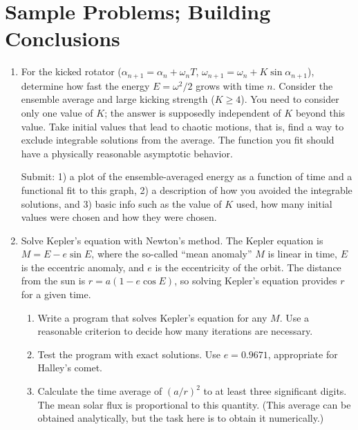 \documentclass{article}
\begin{document}
\section{Sample Problems; Building Conclusions}
\begin{enumerate}
\item \label{prbl:kicked}

For the kicked rotator ($\alpha_{n+1}=\alpha_n+\omega_n T$, $\omega_{n+1}=\omega_n + K\sin\alpha_{n+1}$), determine how fast the energy $E=\omega^2/2$ grows with time $n$.  
Consider the ensemble average and large kicking strength ($K \geq 4$). You need to consider only one value of $K$; the answer is supposedly independent of $K$ beyond this value.
Take initial values that lead to chaotic motions, that is, find a way to exclude integrable solutions from the average.
The function you fit should have a physically reasonable asymptotic behavior.


Submit:  1) a plot of the ensemble-averaged energy as a function of time and a functional fit to this graph, 
2) a description of how you avoided the integrable solutions, and 
3) basic info such as the value of $K$ used, how many initial values were chosen and how they were chosen. \\




\item\label{prbl:kepler}

Solve Kepler's equation with Newton's method.
The Kepler equation is $M=E-e\sin E$, where the so-called ``mean anomaly'' $M$ is linear in time, $E$ is the eccentric anomaly, and $e$ is the eccentricity of the orbit. The distance from the sun is $r = a(1-e\cos E)$, so solving Kepler's equation provides $r$ for a given time.
\begin{enumerate}
\item Write a program that solves Kepler's equation for any $M$.
Use a reasonable criterion to decide how many iterations are necessary.

\item Test the program with exact solutions.
Use $e=0.9671$, appropriate for Halley's comet.

\item Calculate the time average of $(a/r)^2$ to at least three significant digits. The mean solar flux is proportional to this quantity.
(This average can be obtained analytically, but the task here is to obtain it numerically.)\\
\end{enumerate}

\end{enumerate}
\end{document}
